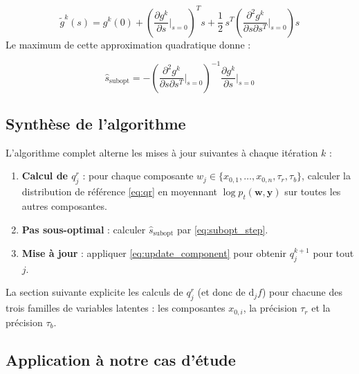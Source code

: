 \documentclass[12pt]{article}
\newcommand{\w}{\boldsymbol{w}}
\newcommand{\y}{\boldsymbol{y}}
\begin{document}
\begin{equation}
    \tilde{g}^k(s) = g^k(0) + \left(\frac{\partial g^k}{\partial s}\bigg|_{s=0}\right)^{\!T}\! s + \frac{1}{2}\, s^T \left(\frac{\partial^2 g^k}{\partial s \partial s^T}\bigg|_{s=0}\right) s
\end{equation}
Le maximum de cette approximation quadratique donne 
:

\begin{resultbox}
\label{res:subopt_step}
\begin{equation}
    \boxed{\hat{s}_{\mathrm{subopt}} = -\left(\frac{\partial^2 g^k}{\partial s \partial s^T}\bigg|_{s=0}\right)^{-1} \frac{\partial g^k}{\partial s}\bigg|_{s=0}}
    \label{eq:subopt_step}
\end{equation}
\end{resultbox}


\subsection{Synthèse de l'algorithme}

L'algorithme complet alterne les mises à jour suivantes à chaque itération 
$k$ 
:
\begin{enumerate}[label=\textbf{\arabic*.}]
    \item \textbf{Calcul de $q_j^r$} 
: pour chaque composante $w_j \in \{x_{0,1}, \ldots, x_{0,n}, \tau_r, \tau_b\}$, calculer la distribution de référence \eqref{eq:qr} en moyennant $\log p_t(\w, \y)$ sur toutes les autres composantes.
    \item \textbf{Pas sous-optimal} 
: calculer $\hat{s}_{\mathrm{subopt}}$ par \eqref{eq:subopt_step}.
    \item \textbf{Mise à jour} 
: appliquer \eqref{eq:update_component} pour obtenir $q_j^{k+1}$ pour tout $j$.
\end{enumerate}

La section suivante explicite les calculs de $q_j^r$ (et donc de $\mathrm{d}_j f$) pour chacune des trois familles de variables latentes 
: les composantes $x_{0,i}$, la précision $\tau_r$ et la précision $\tau_b$.











\subsection{Application à notre cas d'étude}
\end{document}
